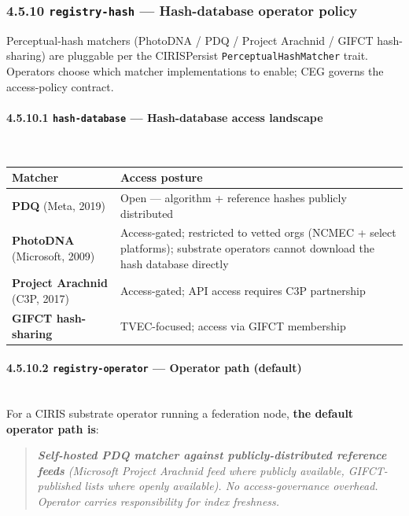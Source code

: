\documentclass[11pt]{article}
\begin{document}
\subsubsection*{4.5.10 \texttt{registry-hash} — Hash-database operator policy}


Perceptual-hash matchers (PhotoDNA / PDQ / Project Arachnid / GIFCT hash-sharing) are pluggable per the CIRISPersist \texttt{PerceptualHashMatcher} trait. Operators choose which matcher implementations to enable; CEG governs the access-policy contract.


\paragraph{4.5.10.1 \texttt{hash-database} — Hash-database access landscape}\mbox{}\\


{\footnotesize
\begin{longtable}{|p{8.0cm}|p{8.0cm}|}\hline
\textbf{Matcher} & \textbf{Access posture} \\ \hline\endhead
\textbf{PDQ} (Meta, 2019) & Open — algorithm + reference hashes publicly distributed \\ \hline
\textbf{PhotoDNA} (Microsoft, 2009) & Access-gated; restricted to vetted orgs (NCMEC + select platforms); substrate operators cannot download the hash database directly \\ \hline
\textbf{Project Arachnid} (C3P, 2017) & Access-gated; API access requires C3P partnership \\ \hline
\textbf{GIFCT hash-sharing} & TVEC-focused; access via GIFCT membership \\ \hline
\end{longtable}}


\paragraph{4.5.10.2 \texttt{registry-operator} — Operator path (default)}\mbox{}\\


For a CIRIS substrate operator running a federation node, \textbf{the default operator path is}:


\begin{quote}\itshape \textbf{Self-hosted PDQ matcher against publicly-distributed reference feeds} (Microsoft Project Arachnid feed where publicly available, GIFCT-published lists where openly available). No access-governance overhead. Operator carries responsibility for index freshness.\end{quote}
\end{document}
